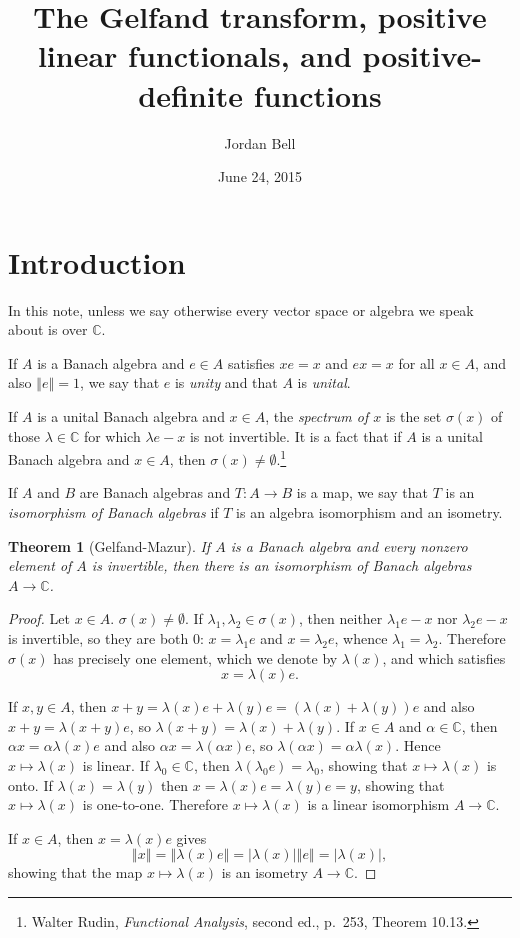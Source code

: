 \documentclass{article}
\newcommand{\norm}[1]{\left\Vert #1 \right\Vert}
\newtheorem{theorem}{Theorem}
\theoremstyle{definition}
\begin{document}
\title{The Gelfand transform,  positive linear functionals, and positive-definite functions}
\author{Jordan Bell}
\date{June 24, 2015}

\maketitle

\section{Introduction}
In this note, unless we say otherwise every vector space or algebra we speak about is over $\mathbb{C}$.

If $A$ is a Banach algebra and $e \in A$ satisfies $xe=x$ and $ex=x$ for all $x \in A$, and also $\norm{e}=1$, we say that $e$ is {\em unity} and  that
$A$ is {\em unital}.

If $A$ is a unital Banach algebra  and $x \in A$, the {\em spectrum of $x$} is the set $\sigma(x)$ of those $\lambda \in \mathbb{C}$
for which $\lambda e-x$ is not invertible. It is a fact that if $A$ is a unital Banach algebra and $x \in A$, then $\sigma(x) \neq \emptyset$.\footnote{Walter
Rudin, {\em Functional Analysis}, second ed., p.~253, Theorem 10.13.}


If $A$ and $B$ are Banach algebras and
$T:A \to B$ is a map, we say that $T$ is an {\em isomorphism of Banach algebras} if $T$ is an algebra isomorphism and an isometry.



\begin{theorem}[Gelfand-Mazur]
If $A$ is a Banach algebra and every nonzero element of $A$   is invertible, then there is an isomorphism of Banach algebras $A \to \mathbb{C}$.
\end{theorem}
\begin{proof}
Let $x \in A$. $\sigma(x) \neq \emptyset$.
If $\lambda_1,\lambda_2 \in \sigma(x)$, then neither
$\lambda_1 e -x$ nor $\lambda_2 e -x$ is  invertible, so they are both $0$: $x = \lambda_1 e$ and $x = \lambda_2 e$, whence
$\lambda_1 = \lambda_2$. Therefore $\sigma(x)$ has precisely one element, which we denote by $\lambda(x)$, and which satisfies
\[
x= \lambda(x) e.
\]

If $x,y \in A$, then
$x+y=\lambda(x)e+\lambda(y)e = (\lambda(x)+\lambda(y))e$
and also $x+y = \lambda(x+y)e$, so
$\lambda(x+y)=\lambda(x)+\lambda(y)$. If $x \in A$ and $\alpha \in \mathbb{C}$, then
$\alpha x = \alpha \lambda(x)e$ and also $\alpha x = \lambda(\alpha x)e$, so $\lambda(\alpha x)=\alpha \lambda(x)$. Hence
$x \mapsto \lambda(x)$ is linear. If $\lambda_0 \in \mathbb{C}$, then $\lambda(\lambda_0 e)=\lambda_0$, showing that $x \mapsto \lambda(x)$
is  onto. If $\lambda(x)=\lambda(y)$ then $x=\lambda(x)e = \lambda(y)e = y$, showing that $x \mapsto \lambda(x)$ is one-to-one. Therefore
$x \mapsto \lambda(x)$ is a linear isomorphism $A \to \mathbb{C}$.

If $x \in A$, then $x = \lambda(x)e$ gives
\[
\norm{x} = \norm{\lambda(x) e} = |\lambda(x)| \norm{e} = |\lambda(x)|,
\]
showing that the map $x \mapsto \lambda(x)$ is an isometry $A \to \mathbb{C}$.
\end{proof}
\end{document}
